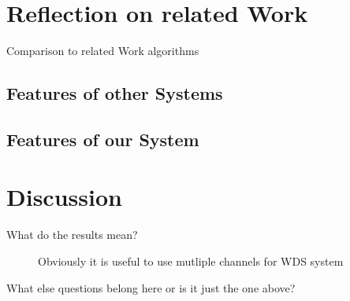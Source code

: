 \section{Reflection on related Work}
  Comparison to related Work algorithms\newline
  \subsection{Features of other Systems}
  \subsection{Features of our System}
\section{Discussion}
  \begin{description}
   \item [What do the results mean?]
   Obviously it is useful to use mutliple channels for WDS system
   \item[What else questions belong here or is it just the one above?]
  \end{description}
